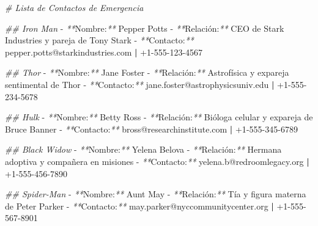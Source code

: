\documentclass[
]{book}
\newenvironment{Shaded}{\begin{snugshade}}{\end{snugshade}}
\newcommand{\CommentTok}[1]{\textcolor[rgb]{0.56,0.35,0.01}{\textit{#1}}}
\newcommand{\ExtensionTok}[1]{#1}
\newcommand{\KeywordTok}[1]{\textcolor[rgb]{0.13,0.29,0.53}{\textbf{#1}}}
\newcommand{\NormalTok}[1]{#1}
\newcommand{\PreprocessorTok}[1]{\textcolor[rgb]{0.56,0.35,0.01}{\textit{#1}}}
\begin{document}
\begin{Shaded}
\begin{Highlighting}[]
\CommentTok{\# Lista de Contactos de Emergencia}

\CommentTok{\#\# Iron Man}
\ExtensionTok{{-}} \PreprocessorTok{**}\NormalTok{Nombre:}\PreprocessorTok{**}\NormalTok{ Pepper Potts  }
\ExtensionTok{{-}} \PreprocessorTok{**}\NormalTok{Relación:}\PreprocessorTok{**}\NormalTok{ CEO de Stark Industries y pareja de Tony Stark  }
\ExtensionTok{{-}} \PreprocessorTok{**}\NormalTok{Contacto:}\PreprocessorTok{**}\NormalTok{ pepper.potts@starkindustries.com }\KeywordTok{|} \ExtensionTok{+1{-}555{-}123{-}4567}

\CommentTok{\#\# Thor}
\ExtensionTok{{-}} \PreprocessorTok{**}\NormalTok{Nombre:}\PreprocessorTok{**}\NormalTok{ Jane Foster  }
\ExtensionTok{{-}} \PreprocessorTok{**}\NormalTok{Relación:}\PreprocessorTok{**}\NormalTok{ Astrofísica y expareja sentimental de Thor  }
\ExtensionTok{{-}} \PreprocessorTok{**}\NormalTok{Contacto:}\PreprocessorTok{**}\NormalTok{ jane.foster@astrophysicsuniv.edu }\KeywordTok{|} \ExtensionTok{+1{-}555{-}234{-}5678}

\CommentTok{\#\# Hulk}
\ExtensionTok{{-}} \PreprocessorTok{**}\NormalTok{Nombre:}\PreprocessorTok{**}\NormalTok{ Betty Ross  }
\ExtensionTok{{-}} \PreprocessorTok{**}\NormalTok{Relación:}\PreprocessorTok{**}\NormalTok{ Bióloga celular y expareja de Bruce Banner  }
\ExtensionTok{{-}} \PreprocessorTok{**}\NormalTok{Contacto:}\PreprocessorTok{**}\NormalTok{ bross@researchinstitute.com }\KeywordTok{|} \ExtensionTok{+1{-}555{-}345{-}6789}

\CommentTok{\#\# Black Widow}
\ExtensionTok{{-}} \PreprocessorTok{**}\NormalTok{Nombre:}\PreprocessorTok{**}\NormalTok{ Yelena Belova  }
\ExtensionTok{{-}} \PreprocessorTok{**}\NormalTok{Relación:}\PreprocessorTok{**}\NormalTok{ Hermana adoptiva y compañera en misiones  }
\ExtensionTok{{-}} \PreprocessorTok{**}\NormalTok{Contacto:}\PreprocessorTok{**}\NormalTok{ yelena.b@redroomlegacy.org }\KeywordTok{|} \ExtensionTok{+1{-}555{-}456{-}7890}

\CommentTok{\#\# Spider{-}Man}
\ExtensionTok{{-}} \PreprocessorTok{**}\NormalTok{Nombre:}\PreprocessorTok{**}\NormalTok{ Aunt May  }
\ExtensionTok{{-}} \PreprocessorTok{**}\NormalTok{Relación:}\PreprocessorTok{**}\NormalTok{ Tía y figura materna de Peter Parker  }
\ExtensionTok{{-}} \PreprocessorTok{**}\NormalTok{Contacto:}\PreprocessorTok{**}\NormalTok{ may.parker@nyccommunitycenter.org }\KeywordTok{|} \ExtensionTok{+1{-}555{-}567{-}8901}


\end{Highlighting}
\end{Shaded}
\end{document}
